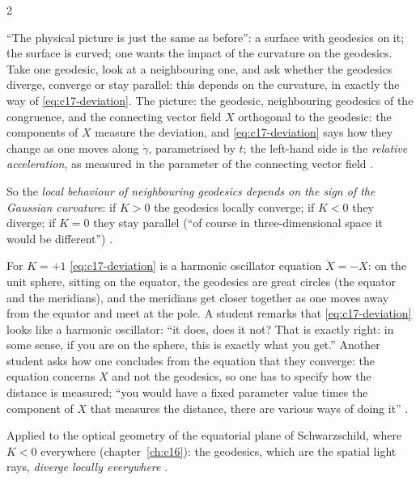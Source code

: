 \begin{paracol}{2}
\begin{coursenote}
``The physical picture is just the same as before'': a surface with geodesics on it; the surface is curved; one wants the impact of the curvature on the geodesics. Take one geodesic, look at a neighbouring one, and ask whether the geodesics diverge, converge or stay parallel: this depends on the curvature, in exactly the way of \eqref{eq:c17-deviation}. The picture: the geodesic, neighbouring geodesics of the congruence, and the connecting vector field $X$ orthogonal to the geodesic: the components of $X$ measure the deviation, and \eqref{eq:c17-deviation} says how they change as one moves along $\dot\gamma$, parametrised by $t$; the left-hand side is the \emph{relative acceleration}, as measured in the parameter of the connecting vector field .
\end{coursenote}
So the \emph{local behaviour of neighbouring geodesics depends on the sign of the Gaussian curvature}: if $K>0$ the geodesics locally converge; if $K<0$ they diverge; if $K=0$ they stay parallel (``of course in three-dimensional space it would be different'') .
\begin{example}\label{ex:c17-sphere}
For $K=+1$ \eqref{eq:c17-deviation} is a harmonic oscillator equation $\ddot X=-X$: on the unit sphere, sitting on the equator, the geodesics are great circles (the equator and the meridians), and the meridians get closer together as one moves away from the equator and meet at the pole. A student remarks that \eqref{eq:c17-deviation} looks like a harmonic oscillator: ``it does, does it not? That is exactly right: in some sense, if you are on the sphere, this is exactly what you get.'' Another student asks how one concludes from the equation that they converge: the equation concerns $X$ and not the geodesics, so one has to specify how the distance is measured; ``you would have a fixed parameter value times the component of $X$ that measures the distance, there are various ways of doing it'' .
\end{example}
Applied to the optical geometry of the equatorial plane of Schwarzschild, where $K<0$ everywhere (chapter~\ref{ch:c16}): the geodesics, which are the spatial light rays, \emph{diverge locally everywhere} .


\end{paracol}
